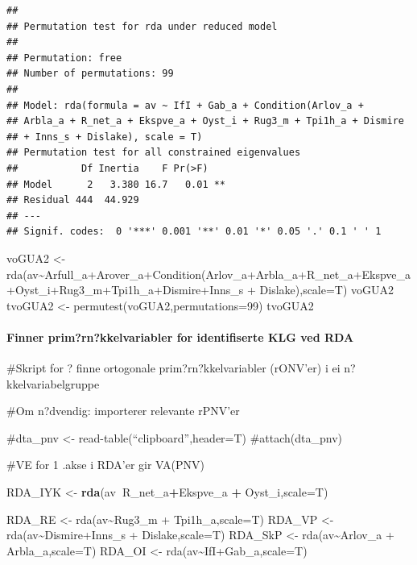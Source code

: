 \documentclass[]{article}
\newenvironment{Shaded}{\begin{snugshade}}{\end{snugshade}}
\newcommand{\DataTypeTok}[1]{\textcolor[rgb]{0.13,0.29,0.53}{#1}}
\newcommand{\KeywordTok}[1]{\textcolor[rgb]{0.13,0.29,0.53}{\textbf{#1}}}
\newcommand{\NormalTok}[1]{#1}
\newcommand{\OperatorTok}[1]{\textcolor[rgb]{0.81,0.36,0.00}{\textbf{#1}}}
\newcommand{\StringTok}[1]{\textcolor[rgb]{0.31,0.60,0.02}{#1}}
\let\oldparagraph\paragraph
\renewcommand{\paragraph}[1]{\oldparagraph{#1}\mbox{}}
\begin{document}
\begin{verbatim}
## 
## Permutation test for rda under reduced model 
## 
## Permutation: free
## Number of permutations: 99
##  
## Model: rda(formula = av ~ IfI + Gab_a + Condition(Arlov_a +
## Arbla_a + R_net_a + Ekspve_a + Oyst_i + Rug3_m + Tpi1h_a + Dismire
## + Inns_s + Dislake), scale = T)
## Permutation test for all constrained eigenvalues
##           Df Inertia    F Pr(>F)   
## Model      2   3.380 16.7   0.01 **
## Residual 444  44.929               
## ---
## Signif. codes:  0 '***' 0.001 '**' 0.01 '*' 0.05 '.' 0.1 ' ' 1
\end{verbatim}

voGUA2 \textless{}-
rda(av\textasciitilde{}Arfull\_a+Arover\_a+Condition(Arlov\_a+Arbla\_a+R\_net\_a+Ekspve\_a+Oyst\_i+Rug3\_m+Tpi1h\_a+Dismire+Inns\_s
+ Dislake),scale=T) voGUA2 tvoGUA2 \textless{}-
permutest(voGUA2,permutations=99) tvoGUA2

\hypertarget{finner-primrnkkelvariabler-for-identifiserte-klg-ved-rda}{%
\paragraph{Finner prim?rn?kkelvariabler for identifiserte KLG ved
RDA}\label{finner-primrnkkelvariabler-for-identifiserte-klg-ved-rda}}

\#Skript for ? finne ortogonale prim?rn?kkelvariabler (rONV'er) i ei
n?kkelvariabelgruppe

\#Om n?dvendig: importerer relevante rPNV'er

\#dta\_pnv \textless{}- read-table(``clipboard'',header=T)
\#attach(dta\_pnv)

\#VE for 1 .akse i RDA'er gir VA(PNV)

\begin{Shaded}
\begin{Highlighting}[]
\NormalTok{RDA_IYK <-}\StringTok{ }\KeywordTok{rda}\NormalTok{(av}\OperatorTok{~}\NormalTok{R_net_a}\OperatorTok{+}\NormalTok{Ekspve_a  }\OperatorTok{+}\StringTok{ }\NormalTok{Oyst_i,}\DataTypeTok{scale=}\NormalTok{T)}
\end{Highlighting}
\end{Shaded}

RDA\_RE \textless{}- rda(av\textasciitilde{}Rug3\_m + Tpi1h\_a,scale=T)
RDA\_VP \textless{}- rda(av\textasciitilde{}Dismire+Inns\_s +
Dislake,scale=T) RDA\_SkP \textless{}- rda(av\textasciitilde{}Arlov\_a +
Arbla\_a,scale=T) RDA\_OI \textless{}-
rda(av\textasciitilde{}IfI+Gab\_a,scale=T)
\end{document}
